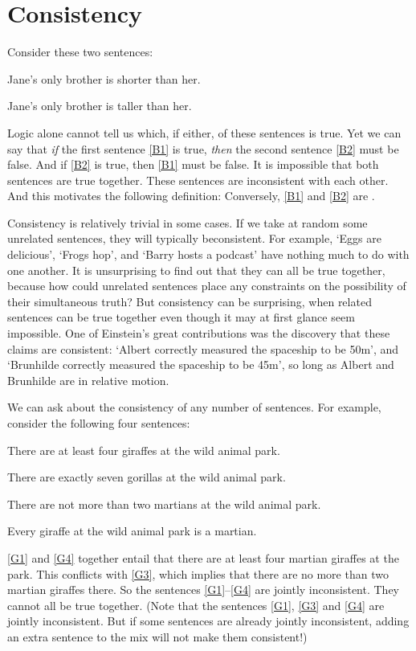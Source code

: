 \section{Consistency}
Consider these two sentences:
	\begin{earg}
		\item[\ex{B1}] Jane's only brother is shorter than her.
		\item[\ex{B2}] Jane's only brother is taller than her.
	\end{earg}
Logic alone cannot tell us which, if either, of these sentences is true. Yet we can say that \emph{if} the first sentence \ref{B1} is true, \emph{then} the second sentence \ref{B2} must be false. And if \ref{B2} is true, then \ref{B1} must be false. It is impossible that both sentences are true together. These sentences are inconsistent with each other. And this motivates the following definition:
Conversely, \ref{B1} and \ref{B2} are .

Consistency is relatively trivial in some cases. If we take at random some unrelated sentences, they will typically beconsistent. For example, ‘Eggs are delicious’, ‘Frogs hop’, and ‘Barry hosts a podcast’ have nothing much to do with one another. It is unsurprising to find out that they can all be true together, because how could unrelated sentences place any constraints on the possibility of their simultaneous truth? But consistency can be surprising, when related sentences can be true together even though it may at first glance seem impossible. One of Einstein's great contributions was the discovery  that these claims are consistent: ‘Albert correctly measured the spaceship to be 50m’, and ‘Brunhilde correctly measured the spaceship to be 45m’, so long as Albert and Brunhilde are in relative motion.

We can ask about the consistency of any number of sentences. For example, consider the following four sentences:
	\label{MartianGiraffes}
	\begin{earg}
		\item[\ex{G1}] There are at least four giraffes at the wild animal park.
		\item[\ex{G2}] There are exactly seven gorillas at the wild animal park.
		\item[\ex{G3}] There are not more than two martians at the wild animal park.
		\item[\ex{G4}] Every giraffe at the wild animal park is a martian.
	\end{earg}
\ref{G1} and \ref{G4} together entail that there are at least four martian giraffes at the park. This conflicts with \ref{G3}, which implies that there are no more than two martian giraffes there. So the sentences \ref{G1}–\ref{G4} are jointly inconsistent. They cannot all be true together. (Note that the sentences \ref{G1}, \ref{G3} and \ref{G4} are jointly inconsistent. But if some sentences are already jointly inconsistent, adding an extra sentence to the mix will not make them consistent!)

